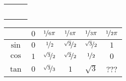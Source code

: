 \documentclass[12pt]{article}
\begin{document}
\begin{longtable}{lll}
	\makecell[l]
	{
	} &
	\makecell[l]
	{
		$
		$
	} &
	\textit{\makecell[l]
		{
	}} \\

	\makecell[l]
	{
	} &
	\makecell[l]
	{
		$
		$
	} &
	\textit{\makecell[l]
		{
	}} \\

	\makecell[l]
	{
	} &
	\makecell[l]
	{
		$
		$
	} &
	\textit{\makecell[l]
		{
	}} \\

	\makecell[l]
	{
	} &
	\makecell[l]
	{
		$
		$
	} &
	\textit{\makecell[l]
		{
	}} \\

	\makecell[l]
	{
	} &
	\makecell[l]
	{
		$
		$
	} &
	\textit{\makecell[l]
		{
	}} \\
\end{longtable}

\begin{tabular}{c|ccccc}
	&
	$0$ &
	$\nicefrac{1}{6} \pi$ &
	$\nicefrac{1}{4} \pi$ &
	$\nicefrac{1}{3} \pi$ &
	$\nicefrac{1}{2} \pi$ \\
	\hline

	$\sin$ &
	$0$ &
	$ \nicefrac{1}{2} $ &
	$ \nicefrac{\sqrt{2}}{2} $ &
	$ \nicefrac{\sqrt{3}}{2} $ &
	$1$ \\

	$\cos$ &
	$1$ &
	$ \nicefrac{\sqrt{3}}{2} $ &
	$ \nicefrac{\sqrt{2}}{2} $ &
	$ \nicefrac{1}{2} $ &
	$0$ \\
	
	$\tan$ &
	$0$ &
	$ \nicefrac{\sqrt{3}}{3} $ &
	$ 1 $ &
	$ \sqrt{3} $ &
	??? \\
	
\end{tabular}
\end{document}
